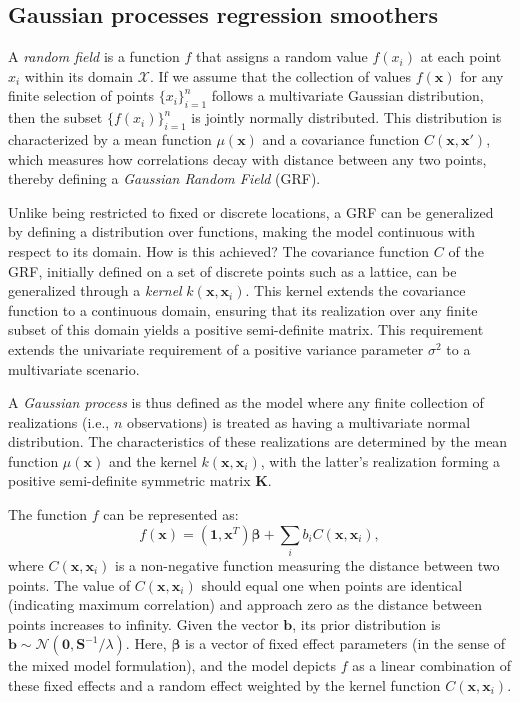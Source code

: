 \documentclass[
11pt, %
oneside, %
english, %
singlespacing, %
]{macthesis} %
\begin{document}
\subsection{Gaussian processes regression smoothers}\label{Gaussian-process-regression-smoothers}

A \emph{random field} is a function \(f\) that assigns a random value \(f(x_i)\) at each point \(x_i\) within its domain \(\mathcal{X}\). If we assume that the collection of values \(f(\mathbf{x})\) for any finite selection of points \(\{x_i\}_{i=1}^n\) follows a multivariate Gaussian distribution, then the subset \(\{f(x_i)\}_{i=1}^n\) is jointly normally distributed. This distribution is characterized by a mean function \(\mu(\mathbf{x})\) and a covariance function \(C(\mathbf{x}, \mathbf{x}')\), which measures how correlations decay with distance between any two points, thereby defining a \emph{Gaussian Random Field} (GRF).

Unlike being restricted to fixed or discrete locations, a GRF can be generalized by defining a distribution over functions, making the model continuous with respect to its domain. How is this achieved? The covariance function \(C\) of the GRF, initially defined on a set of discrete points such as a lattice, can be generalized through a \emph{kernel} \(k(\mathbf{x}, \mathbf{x}_i)\). This kernel extends the covariance function to a continuous domain, ensuring that its realization over any finite subset of this domain yields a positive semi-definite matrix. This requirement extends the univariate requirement of a positive variance parameter \(\sigma^2\) to a multivariate scenario.

A \emph{Gaussian process} is thus defined as the model where any finite collection of realizations (i.e., \(n\) observations) is treated as having a multivariate normal distribution. The characteristics of these realizations are determined by the mean function \(\mu(\mathbf{x})\) and the kernel \(k(\mathbf{x}, \mathbf{x}_i)\), with the latter's realization forming a positive semi-definite symmetric matrix \(\mathbf{K}\).

The function \(f\) can be represented as:
\[
f(\mathbf{x}) = (\mathbf{1}, \mathbf{x}^T)\boldsymbol{\beta} + \sum_i b_i C(\mathbf{x}, \mathbf{x}_i),
\]
where \(C(\mathbf{x}, \mathbf{x}_i)\) is a non-negative function measuring the distance between two points. The value of \(C(\mathbf{x}, \mathbf{x}_i)\) should equal one when points are identical (indicating maximum correlation) and approach zero as the distance between points increases to infinity. Given the vector \(\mathbf{b}\), its prior distribution is \(\mathbf{b} \sim \mathcal{N}(\mathbf{0}, \mathbf{S}^{-1}/\lambda)\). Here, \(\boldsymbol{\beta}\) is a vector of fixed effect parameters (in the sense of the mixed model formulation), and the model depicts \(f\) as a linear combination of these fixed effects and a random effect weighted by the kernel function \(C(\mathbf{x}, \mathbf{x}_i)\).
\end{document}
